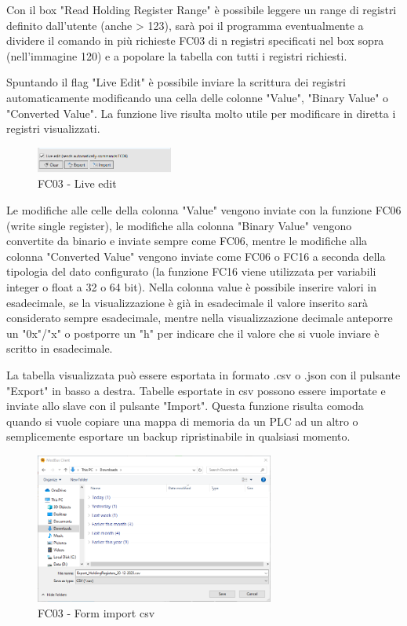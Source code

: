 Con il box "Read Holding Register Range" è possibile leggere un range di registri definito
dall'utente (anche > 123), sarà poi il programma eventualmente a dividere il comando in più
richieste FC03 di n registri specificati nel box sopra (nell'immagine 120)
e a popolare la tabella con tutti i registri richiesti.

Spuntando il flag "Live Edit" è possibile inviare la scrittura dei registri automaticamente
modificando una cella delle colonne "Value", "Binary Value" o "Converted Value". La funzione
live risulta molto utile per modificare in diretta i registri visualizzati.

\begin{figure}[H]
\centering
\includegraphics[width=0.40\textwidth]{../Img/ModBus_Client_HoldingReg_Live.PNG}
\caption{FC03 - Live edit}
\end{figure}

Le modifiche alle celle della colonna "Value" vengono inviate con la funzione FC06
(write single register), le modifiche alla colonna "Binary Value" vengono convertite da
binario e inviate sempre come FC06, mentre le modifiche alla colonna "Converted Value"
vengono inviate come FC06 o FC16 a seconda della tipologia del dato configurato (la funzione 
FC16 viene utilizzata
per variabili integer o float a 32 o 64 bit). Nella colonna value è possibile inserire 
valori in esadecimale, se la visualizzazione è già in esadecimale il valore inserito sarà considerato
sempre esadecimale, mentre nella visualizzazione decimale anteporre un "0x"/"x" o postporre un "h"
per indicare che il valore che si vuole inviare è scritto in esadecimale.

La tabella visualizzata può essere esportata in formato .csv o .json con il pulsante "Export" in basso
a destra. Tabelle esportate in csv possono essere importate e inviate allo slave con il pulsante "Import".
Questa funzione risulta comoda quando si vuole copiare una mappa di memoria da un PLC ad un altro o semplicemente
esportare un backup ripristinabile in qualsiasi momento.

\begin{figure}[H]
\centering
\includegraphics[width=0.70\textwidth]{../Img/ModBus_Client_HoldingReg_Import.PNG}
\caption{FC03 - Form import csv}
\end{figure}


